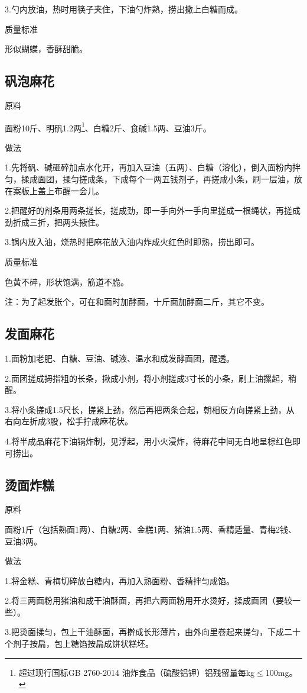 \documentclass{ctexbook}
\begin{document}
3.勺内放油，热时用筷子夹住，下油勺炸熟，捞出撒上白糖而成。

质量标准

形似蝴蝶，香酥甜脆。
\subsection{矾泡麻花}
原料

面粉10斤、明矾1.2两\footnote{超过现行国标GB 2760-2014 油炸食品（硫酸铝钾）铝残留量每kg$\leqslant$100mg。}、白糖2斤、食碱1.5两、豆油3斤。

做法

1.先将矾、碱砸碎加点水化开，再加入豆油（五两）、白糖（溶化），倒入面粉内拌匀，揉成面团，揉匀搓成条，下成每个一两五钱剂子，再搓成小条，刷一层油，放在案板上盖上布醒一会儿。

2.把醒好的剂条用两条搓长，搓成劲，即一手向外一手向里搓成一根绳状，再搓成劲折成三折，把两头掖住。

3.锅内放入油，烧热时把麻花放入油内炸成火红色时即熟，捞出即可。

质量标准

色黄不碎，形状饱满，筋道不脆。

注：为了起发胀个，可在和面时加酵面，十斤面加酵面二斤，其它不变。
\subsection{发面麻花}
1.面粉加老肥、白糖、豆油、碱液、温水和成发酵面团，醒透。

2.面团搓成拇指粗的长条，揪成小剂，将小剂搓成3寸长的小条，刷上油摞起，稍醒。

3.将小条搓成1.5尺长，搓紧上劲，然后再把两条合起，朝相反方向搓紧上劲，从右向左折成3股，松手拧成麻花状。

4.将半成品麻花下油锅炸制，见浮起，用小火浸炸，待麻花中间无白地呈棕红色即可捞出。
\subsection{烫面炸糕}
原料

面粉1斤（包括熟面1两）、白糖2两、金糕1两、猪油1.5两、香精适量、青梅2钱、豆油3两。

做法

1.将金糕、青梅切碎放白糖内，再加入熟面粉、香精拌匀成馅。

2.将三两面粉用猪油和成干油酥面，再把六两面粉用开水烫好，揉成面团（要较一些）。

3.把烫面揉匀，包上干油酥面，再擀成长形薄片，由外向里卷起来搓匀，下成二十个剂子按扁，包上糖馅按扁成饼状糕坯。
\end{document}
